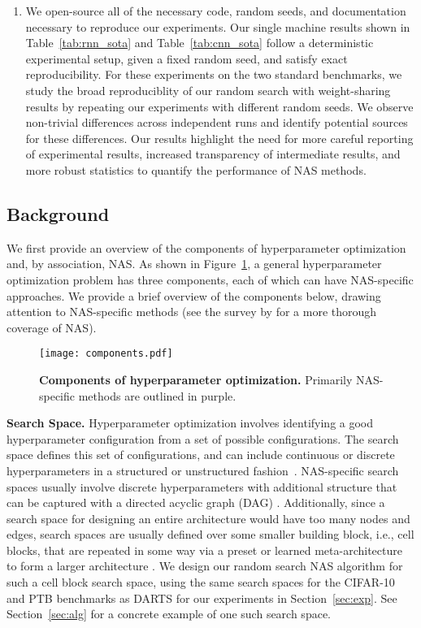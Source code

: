 \documentclass[acmlarge, nonacm]{acmart}
\begin{document}
\begin{enumerate}[leftmargin=*]
    \item 
    We open-source all of the necessary code, random seeds, and documentation necessary to reproduce our experiments.
    Our single machine results shown in Table~\ref{tab:rnn_sota} and Table~\ref{tab:cnn_sota} follow a deterministic experimental setup, given a fixed random seed, and satisfy exact reproducibility.  For these experiments on the two standard benchmarks, we study the broad reproduciblity of our random search with weight-sharing results by repeating our experiments with different random seeds.
    We observe non-trivial differences across independent runs and identify potential sources for these differences. Our results highlight the need for more careful reporting of experimental results, increased transparency of intermediate results, and more robust statistics to quantify the performance of NAS methods. 
    
\end{enumerate}

\subsection{Background}
\label{ssec:background}
We first provide an overview of the components of hyperparameter optimization and, by association, NAS.  
As shown in Figure~\ref{fig:components}, a general hyperparameter optimization problem has three components, each of which can have NAS-specific approaches.  We provide a brief overview of the components below, drawing attention to NAS-specific methods (see the survey by \citet{Elsken2018survey} for a more thorough coverage of NAS).  

\begin{figure}
    \centering
    \texttt{[image: components.pdf]}
    \caption{\textbf{Components of hyperparameter optimization.}  Primarily NAS-specific methods are outlined in purple.}
    \label{fig:components}
\end{figure}

\textbf{Search Space.} Hyperparameter optimization involves identifying a good hyperparameter configuration from a set of possible configurations. The search space defines this set of configurations,
and can include continuous or discrete hyperparameters in a structured or unstructured fashion~\citep{snoek2012practical,bergstra2012random,feurer2015efficient,olson2016tpot}.
NAS-specific search spaces usually involve discrete hyperparameters with additional structure that can be captured with a directed acyclic graph (DAG) \citep{pham18ENAS, liu2018darts}.    Additionally, since a search space for designing an entire architecture would have too many nodes and edges, search spaces are usually defined over some smaller building block, i.e., cell blocks, that are repeated in some way via a preset or learned meta-architecture to form a larger architecture \citep{Elsken2018survey}.  We design our random search NAS algorithm for such a cell block search space, using the same search spaces for the CIFAR-10 and PTB benchmarks as DARTS for our experiments in Section~\ref{sec:exp}. See Section~\ref{sec:alg} for a concrete example of one such search space. 
\end{document}

